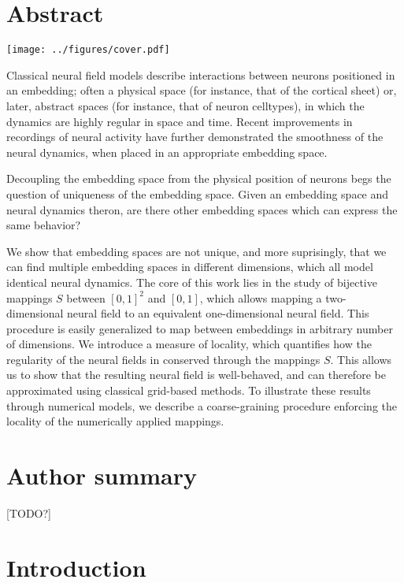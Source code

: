\documentclass[10pt,letterpaper]{article}
\begin{document}
\section*{Abstract}

\texttt{[image: ../figures/cover.pdf]}
\endif

Classical neural field models describe interactions between neurons positioned in an embedding; often a physical space (for instance, that of the cortical sheet) or, later, abstract spaces (for instance, that of neuron celltypes), in which the dynamics are highly regular in space and time. Recent improvements in recordings of neural activity have further demonstrated the smoothness of the neural dynamics, when placed in an appropriate embedding space.

Decoupling the embedding space from the physical position of neurons begs the question of uniqueness of the embedding space. Given an embedding space and neural dynamics theron, are there other embedding spaces which can express the same behavior?

We show that embedding spaces are not unique, and more suprisingly, that we can find multiple embedding spaces in different dimensions, which all model identical neural dynamics.
The core of this work lies in the study of bijective mappings $S$ between $[0,1]^2$ and $[0,1]$, which allows mapping a two-dimensional neural field to an equivalent one-dimensional neural field.
This procedure is easily generalized to map between embeddings in arbitrary number of dimensions.
We introduce a measure of locality, which quantifies how the regularity of the neural fields in conserved through the mappings $S$. This allows us to show that the resulting neural field is well-behaved, and can therefore be approximated using classical grid-based methods.
To illustrate these results through numerical models, we describe a coarse-graining procedure enforcing the locality of the numerically applied mappings.

\section*{Author summary}
[TODO?]
\linenumbers


\section{Introduction}
\end{document}

